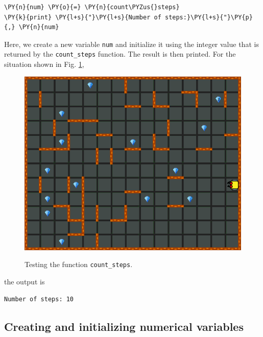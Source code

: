\begin{bbox}
\begin{Verbatim}[commandchars=\\\{\}]
\PY{n}{num} \PY{o}{=} \PY{n}{count\PYZus{}steps}
\PY{k}{print} \PY{l+s}{"}\PY{l+s}{Number of steps:}\PY{l+s}{"}\PY{p}{,} \PY{n}{num} 
\end{Verbatim}
\end{bbox}
\vspace{6mm}

\noindent
Here, we create a new variable {\tt num} and initialize it using the 
integer value that is returned by the {\tt count\_steps} function.
The result is then printed. For the situation shown in Fig. \ref{fig:cf-1},
\newpage

\begin{figure}[!ht]
\begin{center}
\includegraphics[height=0.4\textwidth]{img/maze-new-1.png}
\vspace{-0mm}
\caption{Testing the function {\tt count\_steps}.}
\vspace{-1cm}
\label{fig:cf-1}
\end{center}
\end{figure}

\noindent
the output is\\

\begin{ybox}
\begin{verbatim}
Number of steps: 10
\end{verbatim}
\end{ybox}
\vspace{6mm}
\subsection[\ \ Creating and initializing numerical variables]{Creating and initializing numerical variables} \label{par:var}

